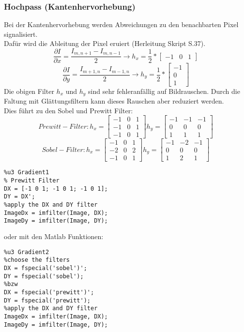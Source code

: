 \subsubsection{Hochpass (Kantenhervorhebung)}
Bei der Kantenhervorhebung werden Abweichungen zu den benachbarten Pixel signalisiert.\\
Dafür wird die Ableitung der Pixel eruiert (Herleitung Skript S.37).
\begin{equation}
\frac{\partial I}{\partial x}=\frac{I_{m,n+1}-I_{m,n-1}}{2} \to h_x = \frac{1}{2}*
\begin{bmatrix}
-1 & 0 & 1
\end{bmatrix}
\end{equation}
\begin{equation}
\frac{\partial I}{\partial y}=\frac{I_{m+1,n}-I_{m-1,n}}{2} \to h_y = \frac{1}{2}*
\begin{bmatrix}
-1 \\
0 \\
1
\end{bmatrix}
\end{equation}
Die obigen Filter $h_x$ und $h_y$ sind sehr fehleranfällig auf Bildrauschen. Durch die Faltung mit Glättungsfiltern kann dieses Rauschen aber reduziert werden.\\
Dies führt zu den Sobel und Prewitt Filter:
\begin{equation*}
Prewitt-Filter: h_x = \begin{bmatrix}
-1 & 0 & 1 \\
-1 & 0 & 1 \\
-1 & 0 & 1
\end{bmatrix}
h_y = \begin{bmatrix}
-1 & -1 & -1 \\
0 & 0 & 0 \\
1 & 1 & 1
\end{bmatrix}
\end{equation*}
\begin{equation*}
Sobel-Filter: h_x = \begin{bmatrix}
-1 & 0 & 1 \\
-2 & 0 & 2 \\
-1 & 0 & 1
\end{bmatrix}
h_y = \begin{bmatrix}
-1 & -2 & -1 \\
0 & 0 & 0 \\
1 & 2 & 1
\end{bmatrix}
\end{equation*}
\begin{lstlisting}
%u3 Gradient1
% Prewitt Filter
DX = [-1 0 1; -1 0 1; -1 0 1];
DY = DX';	
%apply the DX and DY filter
ImageDx = imfilter(Image, DX);
ImageDy = imfilter(Image, DY);
\end{lstlisting}
oder mit den Matlab Funktionen:
\begin{lstlisting}
%u3 Gradient2
%choose the filters
DX = fspecial('sobel')';
DY = fspecial('sobel');
%bzw
DX = fspecial('prewitt')';
DY = fspecial('prewitt');
%apply the DX and DY filter
ImageDx = imfilter(Image, DX);
ImageDy = imfilter(Image, DY);
\end{lstlisting}
